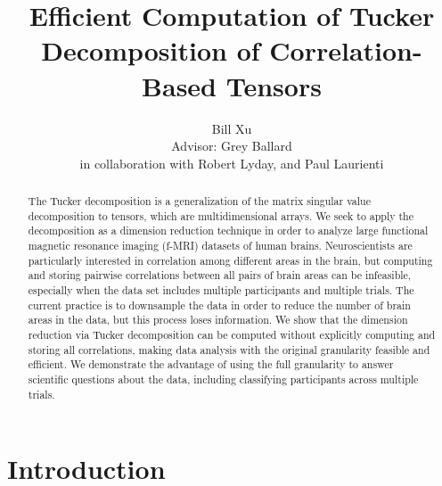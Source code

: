 \documentclass{article}[12pt]
\title{Efficient Computation of Tucker Decomposition of Correlation-Based Tensors}
\author{Bill Xu \medskip \\ Advisor: Grey Ballard \\ in collaboration with Robert Lyday, and Paul Laurienti}
\begin{document}
\maketitle


%


\begin{abstract}
The Tucker decomposition is a generalization of the matrix singular value decomposition to tensors, which are multidimensional arrays.
We seek to apply the decomposition as a dimension reduction technique in order to analyze large functional magnetic resonance imaging (f-MRI) datasets of human brains.
Neuroscientists are particularly interested in correlation among different areas in the brain, but computing and storing pairwise correlations between all pairs of brain areas can be infeasible, especially when the data set includes multiple participants and multiple trials.
The current practice is to downsample the data in order to reduce the number of brain areas in the data, but this process loses information.
We show that the dimension reduction via Tucker decomposition can be computed without explicitly computing and storing all correlations, making data analysis with the original granularity feasible and efficient.
We demonstrate the advantage of using the full granularity to answer scientific questions about the data, including classifying participants across multiple trials.
\end{abstract}


\section{Introduction}
\end{document}
